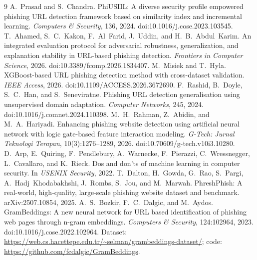 \documentclass[10pt]{article}
\begin{document}
\begin{thebibliography}{9}\small
{} A.~Prasad and S.~Chandra. PhiUSIIL: A diverse security profile empowered phishing URL detection framework based on similarity index and incremental learning. \emph{Computers \& Security}, 136, 2024. doi:10.1016/j.cose.2023.103545.
 T.~Ahamed, S.~C.~Kakon, F.~Al~Farid, J.~Uddin, and H.~B.~Abdul~Karim. An integrated evaluation protocol for adversarial robustness, generalization, and explanation stability in URL-based phishing detection. \emph{Frontiers in Computer Science}, 2026. doi:10.3389/fcomp.2026.1834407.
 M.~Misiek and T.~Hyla. XGBoost-based URL phishing detection method with cross-dataset validation. \emph{IEEE Access}, 2026. doi:10.1109/ACCESS.2026.3672690.
 F.~Rashid, B.~Doyle, S.~C.~Han, and S.~Seneviratne. Phishing URL detection generalisation using unsupervised domain adaptation. \emph{Computer Networks}, 245, 2024. doi:10.1016/j.comnet.2024.110398.
 M.~H.~Rahman, Z.~Abidin, and M.~A.~Hariyadi. Enhancing phishing website detection using artificial neural network with logic gate-based feature interaction modeling. \emph{G-Tech: Jurnal Teknologi Terapan}, 10(3):1276--1289, 2026. doi:10.70609/g-tech.v10i3.10280.
 D.~Arp, E.~Quiring, F.~Pendlebury, A.~Warnecke, F.~Pierazzi, C.~Wressnegger, L.~Cavallaro, and K.~Rieck. Dos and don'ts of machine learning in computer security. In \emph{USENIX Security}, 2022.
 T.~Dalton, H.~Gowda, G.~Rao, S.~Pargi, A.~Hadj~Khodabakhshi, J.~Rombs, S.~Jou, and M.~Marwah. PhreshPhish: A real-world, high-quality, large-scale phishing website dataset and benchmark. arXiv:2507.10854, 2025.
 A.~S.~Bozkir, F.~C.~Dalgic, and M.~Aydos. GramBeddings: A new neural network for URL based identification of phishing web pages through n-gram embeddings. \emph{Computers \& Security}, 124:102964, 2023. doi:10.1016/j.cose.2022.102964. Dataset: \url{https://web.cs.hacettepe.edu.tr/~selman/grambeddings-dataset/}; code: \url{https://github.com/fcdalgic/GramBeddings}.
\end{thebibliography}

\appendix
\end{document}
